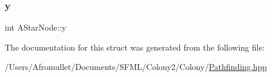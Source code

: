 \mbox{\label{struct_a_star_node_a9d583c923d4a73876a348299ec54f8c0}} 
\subsubsection{\texorpdfstring{y}{y}}
{\footnotesize\ttfamily int A\+Star\+Node\+::y}



The documentation for this struct was generated from the following file\+:\begin{DoxyCompactItemize}
\item 
/\+Users/\+Afromullet/\+Documents/\+S\+F\+M\+L/\+Colony2/\+Colony/\mbox{\hyperlink{_pathfinding_8hpp}{Pathfinding.\+hpp}}\end{DoxyCompactItemize}
